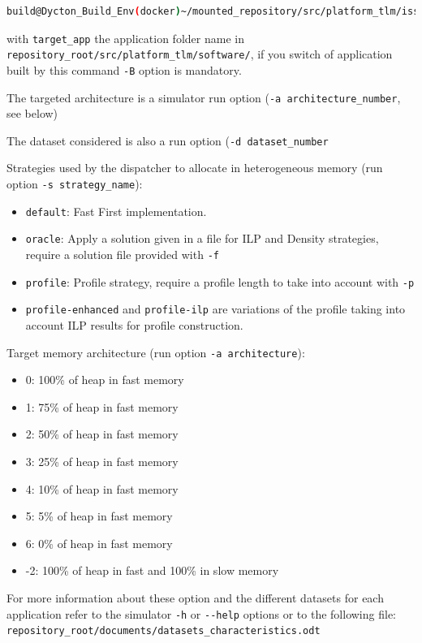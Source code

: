 \documentclass[10 pt]{article}
\begin{document}
\begin{lstlisting}[language=bash]
  build@Dycton_Build_Env(docker)~/mounted_repository/src/platform_tlm/iss$ make DY_SOFT=target_app
\end{lstlisting}

with \lstinline{target_app} the application folder name in \lstinline{repository_root/src/platform_tlm/software/}, if you switch of application built by this command \lstinline{-B} option is mandatory.

\bigskip
The targeted architecture is a simulator run option (\lstinline{-a architecture_number}, see below)

\bigskip
The dataset considered is also a run option (\lstinline{-d dataset_number}


\noindent Strategies used by the dispatcher to allocate in heterogeneous memory (run option \lstinline{-s strategy_name}):
\begin{itemize}
  \item \lstinline{default}: Fast First implementation.
  \item \lstinline{oracle}: Apply a solution given in a file for ILP and Density strategies, require a solution file provided with  \lstinline{-f}
  \item \lstinline{profile}: Profile strategy, require a profile length to take into account with \lstinline{-p}
  \item \lstinline{profile-enhanced} and \lstinline{profile-ilp} are variations of the profile taking into account ILP results for profile construction.
\end{itemize}


\noindent Target memory architecture (run option \lstinline{-a architecture}):
\begin{itemize}
  \item 0: 100\% of heap in fast memory
  \item 1: 75\% of heap in fast memory
  \item 2: 50\% of heap in fast memory
  \item 3: 25\% of heap in fast memory
  \item 4: 10\% of heap in fast memory
  \item 5: 5\% of heap in fast memory
  \item 6: 0\% of heap in fast memory
  \item -2: 100\% of heap in fast and 100\% in slow memory
\end{itemize}

\bigskip
For more information about these option and the different datasets for each application refer to the simulator \lstinline{-h} or \lstinline{--help} options or to the following file: \\\lstinline{repository_root/documents/datasets_characteristics.odt}
\end{document}
